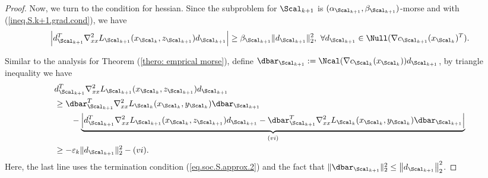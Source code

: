 \begin{proof}
Now, we turn to the condition for hessian. Since the subproblem for $\Scal_{k+1}$ is $(\alpha_{\Scal_{k+1}},\beta_{\Scal_{k+1}})$-morse and with (\ref{ineq.S.k+1.grad.cond}), we have
\[
\left|d_{\Scal_{k+1}}^T\nabla^2_{xx} L_{\Scal_{k+1}}(x_{\Scal_{k}},z_{\Scal_{k+1}})d_{\Scal_{k+1}}\right|\ge \beta_{\Scal_{k+1}}\|d_{\Scal_{k+1}}\|_2^2,\ \forall d_{\Scal_{k+1}}\in\Null(\nabla c_{\Scal_{k+1}}(x_{\Scal_k})^T).
\]

 Similar to the analysis for Theorem (\ref{thero: emprical morse}), define $\dbar_{\Scal_{k+1}}:=\Ncal(\nabla c_{\Scal_{k}}(x_{\Scal_{k}}))d_{\Scal_{k+1}}$, by triangle inequality we have
\begin{align*}
&d_{\Scal_{k+1}}^T\nabla^2_{xx}L_{\Scal_{k+1}}(x_{\Scal_{k}},z_{\Scal_{k+1}})d_{\Scal_{k+1}}\\
	&\ge  \dbar_{\Scal_{k+1}}^T\nabla^2_{xx}L_{\Scal_{k}}(x_{\Scal_{k}},y_{\Scal_{k}})\dbar_{\Scal_{k+1}} \\
	&\hspace{2em} -\underbrace{\left|d_{\Scal_{k+1}}^T\nabla^2_{xx}L_{\Scal_{k+1}}(x_{\Scal_{k}},z_{\Scal_{k+1}})d_{\Scal_{k+1}}-\dbar_{\Scal_{k+1}}^T\nabla^2_{xx}L_{\Scal_{k}}(x_{\Scal_{k}},y_{\Scal_{k}})\dbar_{\Scal_{k+1}}\right|}_{(vi)}\\
	&\ge -\varepsilon_k\|d_{\Scal_{k+1}}\|_2^2-(vi).
\end{align*}
Here, the last line uses the termination condition (\ref{eq.soc.S.approx.2}) and the fact that $\|\dbar_{\Scal_{k+1}}\|_2^2\le \left\|d_{\Scal_{k+1}}\right\|_2^2 $.


\end{proof}
